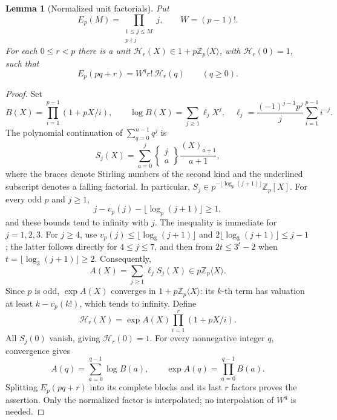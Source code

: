 \documentclass[11pt,a4paper]{article}
\numberwithin{equation}{section}
\newtheorem{lemma}[theorem]{Lemma}
\theoremstyle{remark}
\begin{document}
\begin{lemma}[Normalized unit factorials]
\label{s57:unit-factorials}
Put
\[
 E_p(M)=\prod_{\substack{1\le j\le M\\p\nmid j}}j,
 \qquad W=(p-1)!.
\]
For each \(0\le r<p\) there is a unit
\(\mathcal H_r(X)\in1+p\mathbb Z_p\langle X\rangle\), with
\(\mathcal H_r(0)=1\), such that
\[
             E_p(pq+r)=W^q r!\,\mathcal H_r(q)
                  \qquad(q\ge0).
\]
\end{lemma}
\begin{proof}
Set
\[
 B(X)=\prod_{i=1}^{p-1}(1+pX/i),\qquad
 \log B(X)=\sum_{j\ge1}\ell_jX^j,
 \quad
 \ell_j=\frac{(-1)^{j-1}p^j}{j}\sum_{i=1}^{p-1}i^{-j}.
\]
The polynomial continuation of \(\sum_{q=0}^{n-1}q^j\) is
\[
 S_j(X)=\sum_{a=0}^j
 \left\{\begin{matrix}j\\a\end{matrix}\right\}
 \frac{(X)_{\underline{a+1}}}{a+1},
\]
where the braces denote Stirling numbers of the second kind and the
underlined subscript denotes a falling factorial. In particular,
\(S_j\in p^{-\lfloor\log_p(j+1)\rfloor}\mathbb Z_p[X]\).
For every odd \(p\) and \(j\ge1\),
\[
 j-v_p(j)-\lfloor\log_p(j+1)\rfloor\ge1,
\]
and these bounds tend to infinity with \(j\). The inequality is
immediate for \(j=1,2,3\). For \(j\ge4\), use
\(v_p(j)\le\lfloor\log_3(j+1)\rfloor\) and
\(2\lfloor\log_3(j+1)\rfloor\le j-1\); the latter follows directly
for \(4\le j\le7\), and then from
\(2t\le3^t-2\) when \(t=\lfloor\log_3(j+1)\rfloor\ge2\).
Consequently,
\[
 A(X)=\sum_{j\ge1}\ell_jS_j(X)
                   \in p\mathbb Z_p\langle X\rangle.
\]
Since \(p\) is odd, \(\exp A(X)\) converges in
\(1+p\mathbb Z_p\langle X\rangle\): its \(k\)-th term has valuation
at least \(k-v_p(k!)\), which tends to infinity. Define
\[
 \mathcal H_r(X)=\exp A(X)\prod_{i=1}^r(1+pX/i).
\]
All \(S_j(0)\) vanish, giving \(\mathcal H_r(0)=1\). For every
nonnegative integer \(q\), convergence gives
\[
 A(q)=\sum_{a=0}^{q-1}\log B(a),\qquad
 \exp A(q)=\prod_{a=0}^{q-1}B(a).
\]
Splitting \(E_p(pq+r)\) into its complete blocks and its last \(r\)
factors proves the assertion. Only the normalized factor is
interpolated; no interpolation of \(W^q\) is needed.
\end{proof}
\end{document}
